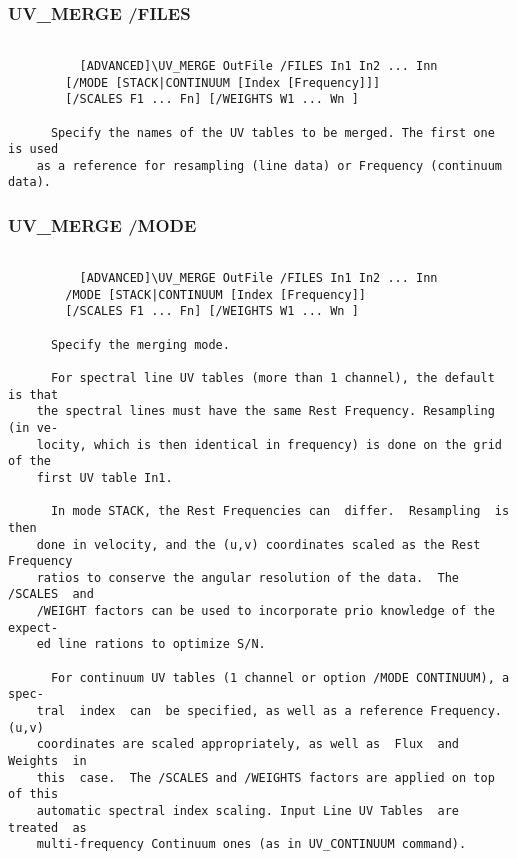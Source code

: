 \subsubsection{UV\_MERGE /FILES}
\begin{verbatim}

          [ADVANCED]\UV_MERGE OutFile /FILES In1 In2 ... Inn
        [/MODE [STACK|CONTINUUM [Index [Frequency]]]
        [/SCALES F1 ... Fn] [/WEIGHTS W1 ... Wn ]

      Specify the names of the UV tables to be merged. The first one is used
    as a reference for resampling (line data) or Frequency (continuum data).

\end{verbatim}
\subsubsection{UV\_MERGE /MODE}
\begin{verbatim}

          [ADVANCED]\UV_MERGE OutFile /FILES In1 In2 ... Inn
        /MODE [STACK|CONTINUUM [Index [Frequency]]
        [/SCALES F1 ... Fn] [/WEIGHTS W1 ... Wn ]

      Specify the merging mode.

      For spectral line UV tables (more than 1 channel), the default is that
    the spectral lines must have the same Rest Frequency. Resampling (in ve-
    locity, which is then identical in frequency) is done on the grid of the
    first UV table In1.

      In mode STACK, the Rest Frequencies can  differ.  Resampling  is  then
    done in velocity, and the (u,v) coordinates scaled as the Rest Frequency
    ratios to conserve the angular resolution of the data.  The /SCALES  and
    /WEIGHT factors can be used to incorporate prio knowledge of the expect-
    ed line rations to optimize S/N.

      For continuum UV tables (1 channel or option /MODE CONTINUUM), a spec-
    tral  index  can  be specified, as well as a reference Frequency.  (u,v)
    coordinates are scaled appropriately, as well as  Flux  and  Weights  in
    this  case.  The /SCALES and /WEIGHTS factors are applied on top of this
    automatic spectral index scaling. Input Line UV Tables  are  treated  as
    multi-frequency Continuum ones (as in UV_CONTINUUM command).

\end{verbatim}
